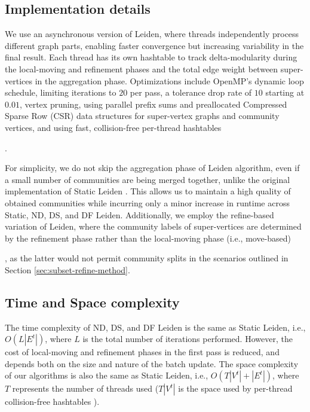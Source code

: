 \subsection{Implementation details}
\label{sec:implementation-details}

We use an asynchronous version of Leiden, where threads independently process different graph parts, enabling faster convergence but increasing variability in the final result. Each thread has its own hashtable to track delta-modularity during the local-moving and refinement phases and the total edge weight between super-vertices in the aggregation phase. Optimizations include OpenMP's dynamic loop schedule, limiting iterations to $20$ per pass, a tolerance drop rate of $10$ starting at $0.01$, vertex pruning, using parallel prefix sums and preallocated Compressed Sparse Row (CSR) data structures for super-vertex graphs and community vertices, and using fast, collision-free per-thread hashtables \cite{sahu2024fast}.

For simplicity, we do not skip the aggregation phase of Leiden algorithm, even if a small number of communities are being merged together, unlike the original implementation of Static Leiden \cite{sahu2024fast}. This allows us to maintain a high quality of obtained communities while incurring only a minor increase in runtime across Static, ND, DS, and DF Leiden. Additionally, we employ the refine-based variation of Leiden, where the community labels of super-vertices are determined by the refinement phase rather than the local-moving phase (i.e., move-based), as the latter would not permit community splits in the scenarios outlined in Section \ref{sec:subset-refine-method}.


\subsection{Time and Space complexity}

The time complexity of ND, DS, and DF Leiden is the same as Static Leiden, i.e., $O(L|E^t|)$, where $L$ is the total number of iterations performed. However, the cost of local-moving and refinement phases in the first pass is reduced, and depends both on the size and nature of the batch update. The space complexity of our algorithms is also the same as Static Leiden, i.e., $O(T|V^t| + |E^t|)$, where $T$ represents the number of threads used ($T|V^t|$ is the space used by per-thread collision-free hashtables \cite{sahu2024fast}).
% 
